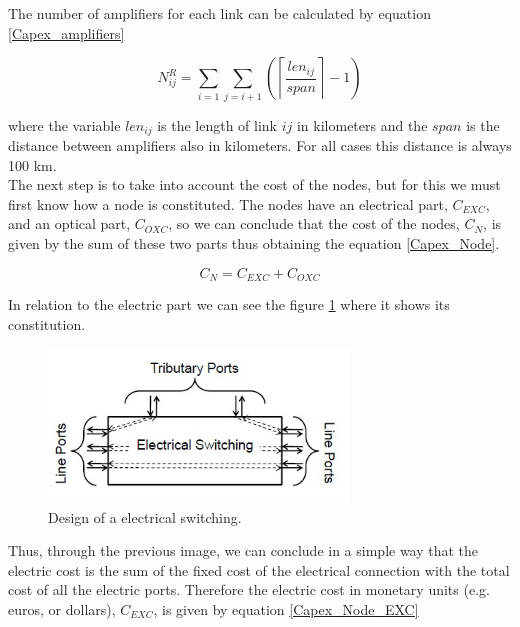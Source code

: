 \vspace{11pt}
The number of amplifiers for each link can be calculated by equation \ref{Capex_amplifiers}

\begin{equation}
N^R_{ij} = \sum_{i=1}\sum\limits_{j=i+1}\left(\left\lceil\frac{len_{ij}}{span}\right\rceil-1\right)
\label{Capex_amplifiers}
\end{equation}

\vspace{11pt}
where the variable $len_{ij}$ is the length of link $ij$ in kilometers and the $span$ is the distance between amplifiers also in kilometers. For all cases this distance is always 100 km.\\

\vspace{13pt}
The next step is to take into account the cost of the nodes, but for this we must first know how a node is constituted. The nodes have an electrical part, $C_{EXC}$, and an optical part, $C_{OXC}$, so we can conclude that the cost of the nodes, $C_N$, is given by the sum of these two parts thus obtaining the equation \ref{Capex_Node}.

\begin{equation}
C_N = C_{EXC} + C_{OXC}
\label{Capex_Node}
\end{equation}

\newpage
In relation to the electric part we can see the figure \ref{exc_design} where it shows its constitution.\\

\begin{figure}[h!]
\centering
\includegraphics[width=8cm]{sdf/ILP/figures/exc_design}
\caption{Design of a electrical switching.}
\label{exc_design}
\end{figure}


Thus, through the previous image, we can conclude in a simple way that the electric cost is the sum of the fixed cost of the electrical connection with the total cost of all the electric ports.
Therefore the electric cost in monetary units (e.g. euros, or dollars), $C_{EXC}$, is given by equation \ref{Capex_Node_EXC}


